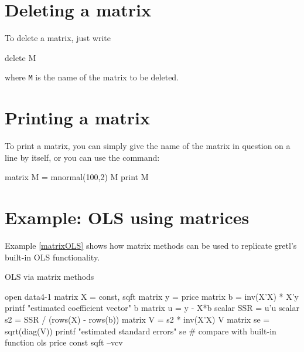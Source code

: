 \section{Deleting a matrix}
\label{matrix-delete}

To delete a matrix, just write
%
\begin{code}
delete M
\end{code}
%
where \texttt{M} is the name of the matrix to be deleted.

\section{Printing a matrix}

To print a matrix, you can simply give the name of the matrix in
question on a line by itself, or you can use the  command:
%
\begin{code}
matrix M = mnormal(100,2)
M
print M
\end{code}

\section{Example: OLS using matrices}
\label{matrix-example}

Example \ref{matrixOLS} shows how matrix methods can be used to
replicate gretl's built-in OLS functionality.

\begin{script}[htbp]
  \caption{OLS via matrix methods}
  \label{matrixOLS}
\begin{scode}
open data4-1
matrix X = { const, sqft }
matrix y = { price }
matrix b = inv(X'X) * X'y
printf "estimated coefficient vector\n"
b
matrix u = y - X*b
scalar SSR = u'u
scalar s2 = SSR / (rows(X) - rows(b))
matrix V = s2 * inv(X'X)
V
matrix se = sqrt(diag(V))
printf "estimated standard errors\n"
se
# compare with built-in function
ols price const sqft --vcv
\end{scode}
\end{script}
\clearpage

